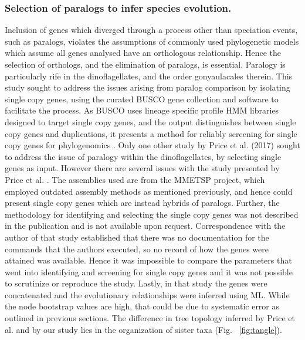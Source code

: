 \documentclass[12pt]{article}
\begin{document}
\subsubsection{Selection of paralogs to infer species evolution.}
\FloatBarrier
Inclusion of genes which diverged through a process other than speciation events, such as paralogs, violates the assumptions of commonly used phylogenetic models which assume all genes analysed have an orthologous relationship.
Hence the selection of orthologs, and the elimination of paralogs, is essential.
Paralogy is particularly rife in the dinoflagellates, and the order gonyaulacales therein.%
This study sought to address the issues arising from paralog comparison by isolating single copy genes, using the curated BUSCO gene collection and software to facilitate the process. 
As BUSCO uses lineage specific profile HMM libraries designed to target single copy genes, and the output distinguishes between single copy genes and duplications, it presents a method for reliably screening for single copy genes for phylogenomics \cite{waterhouse2017busco}.
Only one other study by Price et al. (2017) sought to address the issue of paralogy within the dinoflagellates, by selecting single genes as input. 
However there are several issues with the study presented by Price et al. \cite{price2017robust}. 
The assemblies used are from the MMETSP project, which employed outdated assembly methods as mentioned previously, and hence could present single copy genes which are instead hybrids of paralogs. 
Further, the methodology for identifying and selecting the single copy genes was not described in the publication and is not available upon request. 
Correspondence with the author of that study established that there was no documentation for the commands that the authors executed, so no record of how the genes were attained was available. 
Hence it was impossible to compare the parameters that went into identifying and screening for single copy genes and it was not possible to scrutinize or reproduce the study.
Lastly, in that study the genes were concatenated and the evolutionary relationships were inferred using ML. 
While the node bootstrap values are high, that could be due to systematic error as outlined in previous sections.
The difference in tree topology inferred by Price et al. and by our study lies in the organization of sister taxa (Fig. ~\ref{fig:tangle}). 
\end{document}
